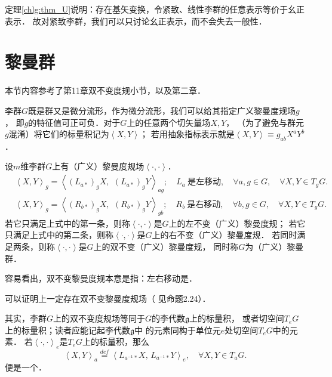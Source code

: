 定理\ref{chlg:thm_U}说明：存在基矢变换，令紧致、线性李群的任意表示等价于幺正表示．
故对紧致李群，我们可以只讨论幺正表示，而不会失去一般性．








\section{黎曼群}\label{chlg:sec_bi-invariant-metric}
本节内容参考了\parencite{oneill1983}第11章双不变度规小节，以及\parencite{Alexandrino-2015}第二章．   

李群$G$既是群又是微分流形，作为微分流形，我们可以给其指定广义黎曼度规场$g$，
即$g$的特征值可正可负．对于$G$上的任意两个切矢量场$X,Y$，
（为了避免与群元$g$混淆）将它们的标量积记为$\left<X,Y\right>$；
若用抽象指标表示就是$\left<X,Y\right>\equiv g_{ab}X^a Y^b$．


\begin{definition}
    设$m$维李群$G$上有（广义）黎曼度规场$\left<\cdot,\cdot \right>$．
    \begin{align*}
        &\left<X,Y\right>_{g} = \left<(L_{a*})_g X,\,\ (L_{a*})_g Y \right>_{ag};
        \quad L_{a} \  \text{是左移动},\quad \forall a,g\in G, \quad \forall X,Y \in T_g G. \\
        &\left<X,Y\right>_{g} = \left<(R_{b*})_g X,\,\ (R_{b*})_g Y \right>_{gb};
        \quad R_{b} \  \text{是右移动} ,\quad \forall b,g\in G, \quad \forall X,Y \in T_g G. 
    \end{align*}
    若它只满足上式中的第一条，则称$\left<\cdot,\cdot \right>$是$G$上的{\heiti 左不变（广义）黎曼度规}；
    若它只满足上式中的第二条，则称$\left<\cdot,\cdot \right>$是$G$上的{\heiti 右不变（广义）黎曼度规}．
    若同时满足两条，则称$\left<\cdot,\cdot \right>$是$G$上的{\heiti 双不变（广义）黎曼度规}，
    同时称$G$为{\heiti （广义）黎曼群}．
\end{definition}
容易看出，双不变黎曼度规本意是指：左右移动是．


可以证明上一定存在双不变黎曼度规场（ 见\parencite[\S 2.2]{Alexandrino-2015}命题2.24）．

其实，李群$G$上的双不变度规场等同于$G$的李代数$\mathfrak{g}$上的标量积，
或者切空间$T_e G$上的标量积；读者应能记起李代数$\mathfrak{g}$中
的元素同构于单位元$e$处切空间$T_e G$中的元素．
若$\left<\cdot,\cdot \right>_e$是$T_e G$上的标量积，那么
\begin{equation}
    \left<X,Y\right>_a \overset{def}{=} 
    \left<L_{a^{-1}*} X,\, L_{a^{-1}*} Y \right>_e, 
    \quad \forall X,Y \in T_a G.
\end{equation}
便是一个．




